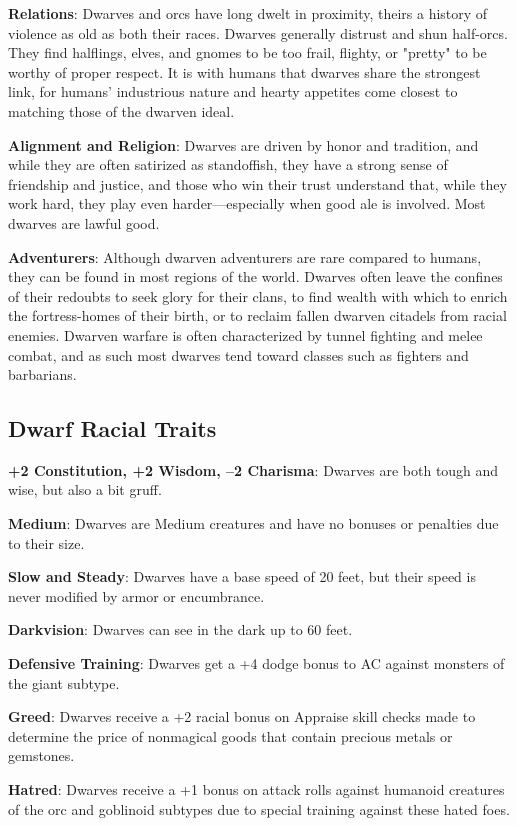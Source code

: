 \textbf{Relations}: Dwarves and orcs have long dwelt in proximity, theirs a history of violence as old as both their races. Dwarves generally distrust and shun half-orcs. They find halflings, elves, and gnomes to be too frail, flighty, or "pretty" to be worthy of proper respect. It is with humans that dwarves share the strongest link, for humans' industrious nature and hearty appetites come closest to matching those of the dwarven ideal. 
				
\textbf{Alignment and Religion}: Dwarves are driven by honor and tradition, and while they are often satirized as standoffish, they have a strong sense of friendship and justice, and those who win their trust understand that, while they work hard, they play even harder---especially when good ale is involved. Most dwarves are lawful good.
				
\textbf{Adventurers}: Although dwarven adventurers are rare compared to humans, they can be found in most regions of the world. Dwarves often leave the confines of their redoubts to seek glory for their clans, to find wealth with which to enrich the fortress-homes of their birth, or to reclaim fallen dwarven citadels from racial enemies. Dwarven warfare is often characterized by tunnel fighting and melee combat, and as such most dwarves tend toward classes such as fighters and barbarians. 
											
\subsection{Dwarf Racial Traits}

				
\textbf{+2 Constitution, +2 Wisdom, --2 Charisma}: Dwarves are both tough and wise, but also a bit gruff.
				
\textbf{Medium}: Dwarves are Medium creatures and have no bonuses or penalties due to their size.
				
\textbf{Slow and Steady}: Dwarves have a base speed of 20 feet, but their speed is never modified by armor or encumbrance.
				
\textbf{Darkvision}: Dwarves can see in the dark up to 60 feet.
				
\textbf{Defensive Training}: Dwarves get a +4 dodge bonus to AC against monsters of the giant subtype. 
				
\textbf{Greed}: Dwarves receive a +2 racial bonus on Appraise skill checks made to determine the price of nonmagical goods that contain precious metals or gemstones.
				
\textbf{Hatred}: Dwarves receive a +1 bonus on attack rolls against humanoid creatures of the orc and goblinoid subtypes due to special training against these hated foes.
				
